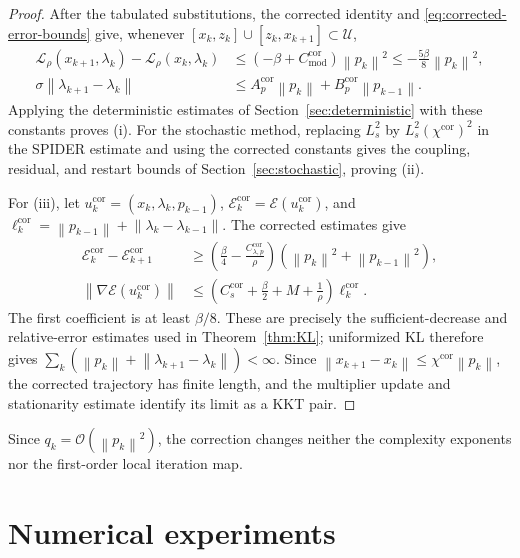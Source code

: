 \documentclass[11pt]{article}
\theoremstyle{definition}
\theoremstyle{remark}
\numberwithin{equation}{section}
\numberwithin{figure}{section}
\numberwithin{table}{section}
\numberwithin{algorithm}{section}
\newcommand{\cL}{\mathcal{L}}
\newcommand{\norm}[1]{\left\lVert #1\right\rVert}
\newcommand{\grad}{\nabla}
\begin{document}
\begin{proof}
After the tabulated substitutions, the corrected identity and
\eqref{eq:corrected-error-bounds} give, whenever $[x_k,z_k]\cup[z_k,x_{k+1}]\subset\mathcal U$,
\begin{align*}
 \cL_\rho(x_{k+1},\lambda_k)-\cL_\rho(x_k,\lambda_k)
 &\le(-\beta+C_{\mathrm{mod}}^{\mathrm{cor}})\norm{p_k}^2
 \le-\frac{5\beta}{8}\norm{p_k}^2,\\
 \sigma\norm{\lambda_{k+1}-\lambda_k}
 &\le A_p^{\mathrm{cor}}\norm{p_k}
 +B_p^{\mathrm{cor}}\norm{p_{k-1}}.
\end{align*}
Applying the deterministic estimates of Section~\ref{sec:deterministic} with these constants proves \textup{(i)}.  For the stochastic method, replacing $L_s^2$ by $L_s^2(\chi^{\mathrm{cor}})^2$ in the SPIDER estimate and using the
corrected constants gives the coupling, residual, and restart bounds of Section~\ref{sec:stochastic}, proving \textup{(ii)}.

For \textup{(iii)}, let
\(u_k^{\mathrm{cor}}=(x_k,\lambda_k,p_{k-1})\),
\(\mathcal E_k^{\mathrm{cor}}=\mathcal E(u_k^{\mathrm{cor}})\), and
\(\ell_k^{\mathrm{cor}}=\norm{p_{k-1}}+
\norm{\lambda_k-\lambda_{k-1}}\).  The corrected estimates give
\begin{align*}
 \mathcal E_k^{\mathrm{cor}}-\mathcal E_{k+1}^{\mathrm{cor}}
 &\ge\left(\frac{\beta}{4}
 -\frac{C_{\lambda,p}^{\mathrm{cor}}}{\rho}\right)
 (\norm{p_k}^2+\norm{p_{k-1}}^2),\\
 \norm{\grad\mathcal E(u_k^{\mathrm{cor}})}
 &\le\left(C_s^{\mathrm{cor}}+\frac{\beta}{2}+M+\frac1\rho\right)
 \ell_k^{\mathrm{cor}} .
\end{align*}
The first coefficient is at least \(\beta/8\).  These are precisely the sufficient-decrease and relative-error estimates used in Theorem~\ref{thm:KL}; uniformized KL therefore gives
\(\sum_k(\norm{p_k}+\norm{\lambda_{k+1}-\lambda_k})<\infty\).
Since \(\norm{x_{k+1}-x_k}\le\chi^{\mathrm{cor}}\norm{p_k}\), the corrected trajectory has finite length, and the multiplier update and stationarity estimate identify its limit as a KKT pair.
\end{proof}

Since \(q_k=\mathcal O(\norm{p_k}^2)\), the correction changes neither the complexity exponents nor the first-order local iteration map.

\section{Numerical experiments}
\label{sec:numerics}
\end{document}
